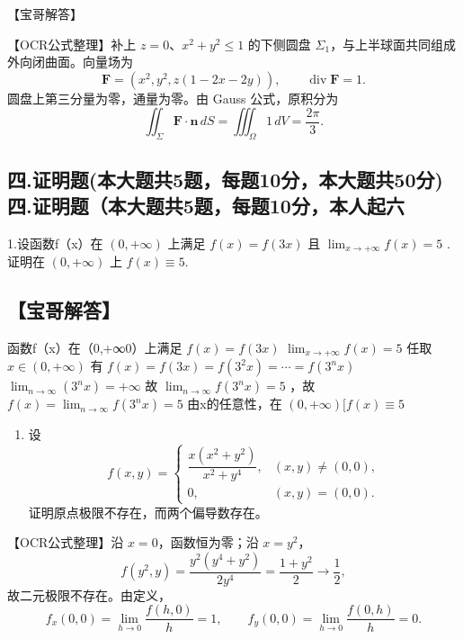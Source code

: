 \documentclass[11pt,fontset=fandol]{ctexart}
\providecommand{\tightlist}{\setlength{\itemsep}{0pt}\setlength{\parskip}{0pt}}
\begin{document}
【宝哥解答】

【OCR公式整理】补上 \(z=0\)、\(x^2+y^2\le1\) 的下侧圆盘
\(\Sigma_1\)，与上半球面共同组成外向闭曲面。向量场为 \[
\mathbf F=(x^2,y^2,z(1-2x-2y)),\qquad \operatorname{div}\mathbf F=1.
\] 圆盘上第三分量为零，通量为零。由 Gauss 公式，原积分为 \[
\iint_\Sigma\mathbf F\cdot\mathbf n\,dS
=\iiint_\Omega1\,dV=\frac{2\pi}{3}.
\]

\subsection{四.证明题(本大题共5题，每题10分，本大题共50分)
四.证明题（本大题共5题，每题10分，本人起六}\label{ux56db.ux8bc1ux660eux9898ux672cux5927ux9898ux51715ux9898ux6bcfux989810ux5206ux672cux5927ux9898ux517150ux5206-ux56db.ux8bc1ux660eux9898ux672cux5927ux9898ux51715ux9898ux6bcfux989810ux5206ux672cux4ebaux8d77ux516d}

1.设函数f（x）在 \(( 0 , + \infty )\) 上满足 \(f ( x ) = f ( 3 x )\) 且
\(\lim _ { x \to + \infty } f ( x ) = 5\) .证明在 \(( 0 , + \infty )\)
上 \(f ( x ) \equiv 5 .\)

\subsection{【宝哥解答】}\label{ux5b9dux54e5ux89e3ux7b54-3}

函数f（x）在（0,+∞0）上满足 \(f ( x ) = f ( 3 x )\)
\(\lim _ { x \to + \infty } f ( x ) = 5\) 任取
\(x \in ( 0 , + \infty )\) 有
\(f ( x ) = f ( 3 x ) = f ( 3 ^ { 2 } x ) = \cdots = f ( 3 ^ { n } x )\)
\(\lim _ { n \to \infty } ( 3 ^ { n } x ) = + \infty\) 故
\(\lim _ { n \to \infty } f ( 3 ^ { n } x ) = 5\)
，故\(f ( x ) = \lim _ { n \to \infty } f ( 3 ^ { n } x ) = 5\)
由x的任意性，在 \(( 0 , + \infty ) [ f ( x ) \equiv 5\)

\begin{enumerate}
\def\labelenumi{\arabic{enumi}.}
\setcounter{enumi}{1}
\tightlist
\item
  设 \[
  f(x,y)=\begin{cases}
  \dfrac{x(x^2+y^2)}{x^2+y^4},&(x,y)\ne(0,0),\\
  0,&(x,y)=(0,0).
  \end{cases}
  \] 证明原点极限不存在，而两个偏导数存在。
\end{enumerate}

【OCR公式整理】沿 \(x=0\)，函数恒为零；沿 \(x=y^2\)， \[
f(y^2,y)=\frac{y^2(y^4+y^2)}{2y^4}=\frac{1+y^2}{2}\to\frac12,
\] 故二元极限不存在。由定义， \[
f_x(0,0)=\lim_{h\to0}\frac{f(h,0)}h=1,\qquad
f_y(0,0)=\lim_{h\to0}\frac{f(0,h)}h=0.
\]
\end{document}
